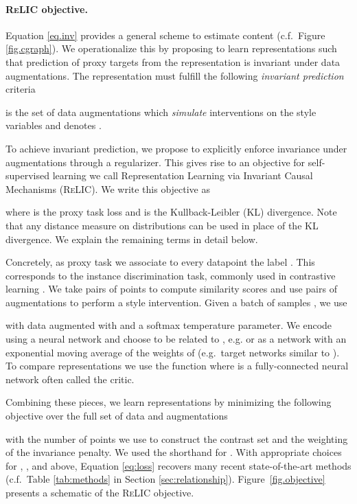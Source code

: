 \documentclass{article}
\newcommand{\relic}{\textsc{ReLIC}}
\begin{document}
\paragraph{\relic{} objective.} 
Equation \ref{eq.inv} provides a general scheme to estimate content (c.f.\ Figure \ref{fig.cgraph}). 
We operationalize this by proposing to learn representations such that prediction of proxy targets from the representation is invariant under data augmentations.
The representation  must fulfill the following \emph{invariant prediction} criteria

 is the set of data augmentations which \emph{simulate} interventions on the style variables and  denotes .

To achieve invariant prediction, we propose to explicitly enforce invariance under augmentations through a regularizer.
This gives rise to an objective for self-supervised learning we call Representation Learning via Invariant Causal Mechanisms (\relic).
We write this objective as

where  is the proxy task loss and  is the Kullback-Leibler (KL) divergence.
Note that any distance measure on distributions can be used in place of the KL divergence. We explain the remaining terms in detail below.

Concretely, as proxy task we associate to every datapoint  the label . 
This corresponds to the instance discrimination task, commonly used in contrastive learning \citep{hadsell2006dimensionality}.
We take pairs of points  to compute similarity scores and use pairs of augmentations  to perform a style intervention.
Given a batch of samples , we use

with  data augmented with  and  a softmax temperature parameter. 
We  encode  using a neural network and choose  to be related to , e.g.  or as a network with an exponential moving average of the weights of  (e.g.\ target networks similar to \citep{grill2020bootstrap}). 
To compare representations we use the function  where  is a fully-connected neural network often called the critic. 

Combining these pieces, we learn representations by minimizing the following objective over the full set of data  and augmentations 

with  the number of points we use to construct the contrast set and  the weighting of the invariance penalty.
We used the shorthand  for .
With appropriate choices for , ,  and  above, Equation \ref{eq:loss} recovers many recent state-of-the-art methods (c.f.\ Table \ref{tab:methods} in Section \ref{sec:relationship}). Figure~\ref{fig.objective} presents a schematic of the \relic{} objective. 
\end{document}
